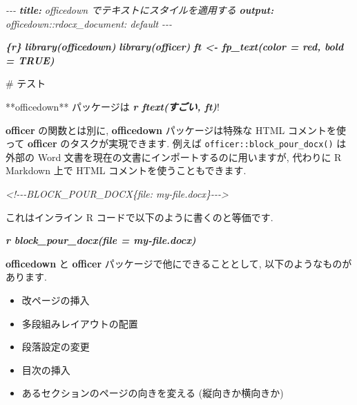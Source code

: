 \documentclass[
  11pt,
  lualatex,
  ja=standard]{bxjsreport}
\newenvironment{Shaded}{\begin{snugshade}}{\end{snugshade}}
\newcommand{\AnnotationTok}[1]{\textcolor[rgb]{0.56,0.35,0.01}{\textbf{\textit{#1}}}}
\newcommand{\CommentTok}[1]{\textcolor[rgb]{0.56,0.35,0.01}{\textit{#1}}}
\newcommand{\FunctionTok}[1]{\textcolor[rgb]{0.00,0.00,0.00}{#1}}
\newcommand{\InformationTok}[1]{\textcolor[rgb]{0.56,0.35,0.01}{\textbf{\textit{#1}}}}
\newcommand{\NormalTok}[1]{#1}
\begin{document}
\begin{Shaded}
\begin{Highlighting}[]
\CommentTok{{-}{-}{-}}
\AnnotationTok{title:}\CommentTok{ officedown でテキストにスタイルを適用する}
\AnnotationTok{output:}
\CommentTok{  officedown::rdocx\_document: default}
\CommentTok{{-}{-}{-}}

\InformationTok{\textasciigrave{}\textasciigrave{}\textasciigrave{}\{r\}}
\InformationTok{library(officedown)}
\InformationTok{library(officer)}
\InformationTok{ft \textless{}{-} fp\_text(color = \textquotesingle{}red\textquotesingle{}, bold = TRUE)}
\InformationTok{\textasciigrave{}\textasciigrave{}\textasciigrave{}}

\FunctionTok{\# テスト}

\NormalTok{**officedown** パッケージは }\InformationTok{\textasciigrave{}r ftext(\textquotesingle{}すごい\textquotesingle{}, ft)\textasciigrave{}}\NormalTok{!}
\end{Highlighting}
\end{Shaded}

\textbf{officer} の関数とは別に, \textbf{officedown} パッケージは特殊な HTML コメントを使って \textbf{officer} のタスクが実現できます. 例えば \texttt{officer::block\_pour\_docx()} は外部の Word 文書を現在の文書にインポートするのに用いますが, 代わりに R Markdown 上で HTML コメントを使うこともできます.

\begin{Shaded}
\begin{Highlighting}[]
\CommentTok{\textless{}!{-}{-}{-}BLOCK\_POUR\_DOCX\{file: \textquotesingle{}my{-}file.docx\textquotesingle{}\}{-}{-}{-}\textgreater{}}
\end{Highlighting}
\end{Shaded}

これはインライン R コードで以下のように書くのと等価です.

\begin{Shaded}
\begin{Highlighting}[]
\InformationTok{\textasciigrave{}r block\_pour\_docx(file = \textquotesingle{}my{-}file.docx\textquotesingle{})\textasciigrave{}}
\end{Highlighting}
\end{Shaded}

\textbf{officedown} と \textbf{officer} パッケージで他にできることとして, 以下のようなものがあります.

\begin{itemize}
\item
  改ページの挿入
\item
  多段組みレイアウトの配置
\item
  段落設定の変更
\item
  目次の挿入
\item
  あるセクションのページの向きを変える (縦向きか横向きか)
\end{itemize}
\end{document}
